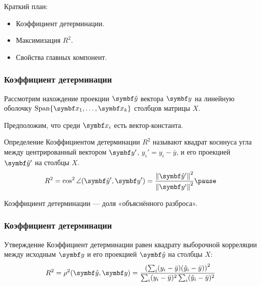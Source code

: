 
\begin{frame} %


\end{frame}



\begin{frame}{Краткий план:}
  \begin{itemize}[<+->]
    \item Коэффициент детерминации.
    \item Максимизация $R^2$.
    \item Свойства главных компонент.
  \end{itemize}

\end{frame}




\begin{frame}
  \frametitle{Коэффициент детерминации}

  
  Рассмотрим нахождение проекции $\bhy$ вектора $\by$ на
  линейную оболочку $\Span\{ \bx_1, \ldots, \bx_k\}$ столбцов матрицы $X$. \pause

  Предположим, что среди $\bx_i$ есть вектор-константа. \pause 

  \begin{block}{Определение}
    \alert{Коэффициентом детерминации $R^2$} называют квадрат косинуса угла 
    между центрированный вектором $\by'$, $y_i' = y_i - \bar y$,
    и его проекцией $\bhy'$ на столбцы $X$.
    \[
      R^2 = \cos^2 \angle(\bhy', \by') = \frac{\norm{\bhy'}^2}{\norm{\by'}^2} \pause
    \]
  \end{block}

  Коэффициент детерминации — доля «объяснённого разброса». 

\end{frame}

\begin{frame}
\frametitle{Коэффициент детерминации}

  \begin{block}{Утверждение}
  Коэффициент детерминации равен 
    квадрату выборочной корреляции между исходным $\by$ и его проекцией $\bhy$ на столбцы $X$:
    \[
      R^2 = \rho^2 (\bhy, \by) = \frac{\left( \sum_i (y_i - \bar y) (\hat y_i - \bar y) \right)^2}{\sum_i (y_i - \bar y)^2 \sum_i (\hat y_i - \bar y)^2 }
    \]
  \end{block}

\end{frame}




